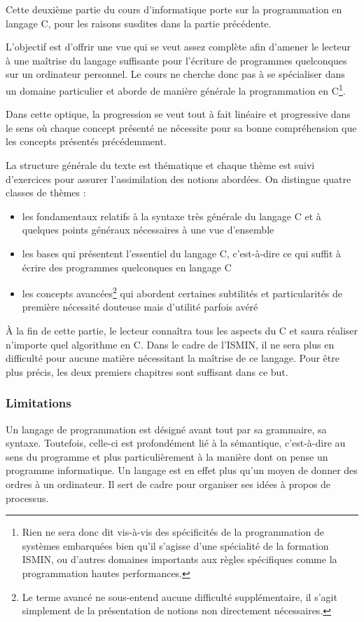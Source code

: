 \documentclass[../../main.tex]{subfiles}
\begin{document}
Cette deuxième partie du cours d'informatique porte sur la programmation en langage C, pour les raisons susdites dans la partie précédente.
 
L'objectif est d'offrir une vue qui se veut assez complète afin d'amener le lecteur à une maîtrise du langage suffisante pour l'écriture de programmes quelconques sur un ordinateur personnel. Le cours ne cherche donc pas à se spécialiser dans un domaine particulier et aborde de manière générale la programmation en C\footnote{Rien ne sera donc dit vis-à-vis des spécificités de la programmation de systèmes embarquées bien qu'il s'agisse d'une spécialité de la formation ISMIN, ou d'autres domaines importants aux règles spécifiques comme la programmation hautes performances.}.

Dans cette optique, la progression se veut tout à fait linéaire et progressive dans le sens où chaque concept présenté ne nécessite pour sa bonne compréhension que les concepts présentés précédemment.

La structure générale du texte est thématique et chaque thème est suivi d'exercices pour assurer l'assimilation des notions abordées. On distingue quatre classes de thèmes :
\begin{itemize}
	\item les fondamentaux relatifs à la syntaxe très générale du langage C et à quelques points généraux nécessaires à une vue d'ensemble
	\item les bases qui présentent l'essentiel du langage C, c'est-à-dire ce qui suffit à écrire des programmes quelconques en langage C
	\item les concepts avancées\footnote{Le terme \og avancé \fg ne sous-entend aucune difficulté supplémentaire, il s'agit simplement de la présentation de notions non directement nécessaires.} qui abordent certaines subtilités et particularités de première nécessité douteuse mais d'utilité parfois avéré
\end{itemize}
À la fin de cette partie, le lecteur connaîtra tous les aspects du C et saura réaliser n'importe quel algorithme en C. Dans le cadre de l'ISMIN, il ne sera plus en difficulté pour aucune matière nécessitant la maîtrise de ce langage. Pour être plus précis, les deux premiers chapitres sont suffisant dans ce but.

\subsubsection{Limitations}
Un langage de programmation est désigné avant tout par sa grammaire, sa syntaxe. Toutefois, celle-ci est profondément lié à la sémantique, c'est-à-dire au sens du programme et plus particulièrement à la manière dont on pense un programme informatique. Un langage est en effet plus qu'un moyen de donner des ordres à un ordinateur. Il sert de cadre pour organiser ses idées à propos de processus.
\end{document}
